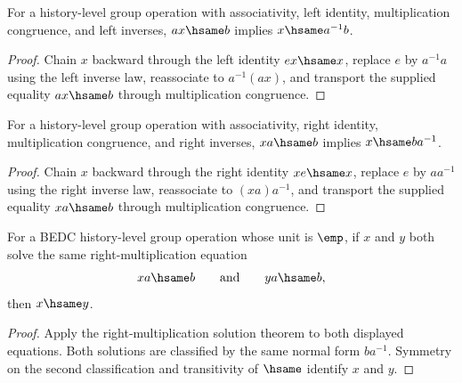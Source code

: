 \begin{theorem}
\label{thm:group-left-mul-equation-solution}
For a history-level group operation with associativity, left identity,
multiplication congruence, and left inverses, $ax\hsame b$ implies
$x\hsame a^{-1}b$.
\end{theorem}
\begin{proof}
Chain $x$ backward through the left identity $ex\hsame x$, replace $e$ by
$a^{-1}a$ using the left inverse law, reassociate to $a^{-1}(ax)$, and
transport the supplied equality $ax\hsame b$ through multiplication congruence.
\end{proof}

\begin{theorem}
\label{thm:group-right-mul-equation-solution}
For a history-level group operation with associativity, right identity,
multiplication congruence, and right inverses, $xa\hsame b$ implies
$x\hsame ba^{-1}$.
\end{theorem}
\begin{proof}
Chain $x$ backward through the right identity $xe\hsame x$, replace $e$ by
$aa^{-1}$ using the right inverse law, reassociate to $(xa)a^{-1}$, and
transport the supplied equality $xa\hsame b$ through multiplication congruence.
\end{proof}

\begin{theorem}
\label{thm:group-right-mul-equation-solution-unique-from-empty-unit}
For a BEDC history-level group operation whose unit is $\emp$, if $x$ and $y$
both solve the same right-multiplication equation
$$
xa\hsame b
\qquad\text{and}\qquad
ya\hsame b,
$$
then $x\hsame y$.
\end{theorem}
\begin{proof}
Apply the right-multiplication solution theorem to both displayed equations.
Both solutions are classified by the same normal form $ba^{-1}$. Symmetry on
the second classification and transitivity of $\hsame$ identify $x$ and $y$.
\end{proof}

